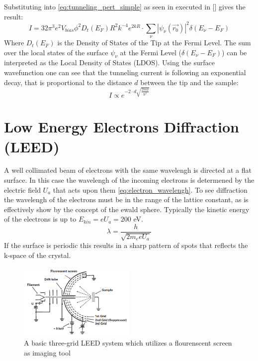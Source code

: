 Substituting into \ref{eq:tunneling_pert_simple} as seen in executed in [\cite{PhysRevLett}] gives the result:
\begin{equation}
    I = 32 \pi^3e^2 V_{bias}\phi^2 D_t(E_F)R^2 k^{-4} e^{2kR} \cdot \sum_{\nu} |\psi_{\nu}(\vec{r_0})|^2 \delta(E_{\nu} - E_F) 
\end{equation}
Where $D_t(E_F)$ is the Density of States of the Tip at the Fermi Level. 
The sum over the local states of the surface $\psi_{\nu}$ at the Fermi Level ($\delta(E_{\nu} - E_F)$) can be interpreted as the Local Density of States (LDOS).
Using the surface wavefunction one can see that the tunneling current is following an exponential decay, that is proportional to the distance $d$ between the tip and the sample:
\begin{equation}
    I \varpropto e^{-2 \cdot d \sqrt{\frac{2m \phi}{\hbar^2}}}
    \label{eq:propcurrent}
\end{equation}




\newpage

\section{Low Energy Electrons Diffraction (LEED)}
A well collimated beam of electrons with the same wavelengh is directed at a flat surface.
In this case the wavelengh of the incoming electrons is determened by the electric field $U_a$ that acts upon them \ref{eq:electron_wavelengh}.
To see diffraction the wavelengh of the electrons must be in the range of the lattice constant, as is effectively show by the concept of the ewald sphere.
Typically the kinetic energy of the electrons is up to $E_{kin} = e U_a = 200$ eV.
\begin{equation}
    \lambda = \frac{h}{\sqrt{2 m_e e U_a}}
    \label{eq:electron_wavelengh}
\end{equation} 
If the surface is periodic this results in a sharp pattern of spots that reflects the k-space of the crystal.

\begin{figure}
    \centering
    \includegraphics[width=0.5\textwidth]{graphics/fundamental_leed_setup.PNG}
    \caption{A basic three-grid LEED system which utilizes a flourenscent screen as imaging tool \cite{MoritzWolfgang2022SSDb}}
    \label{fig:LEED_Shematics}
\end{figure}

